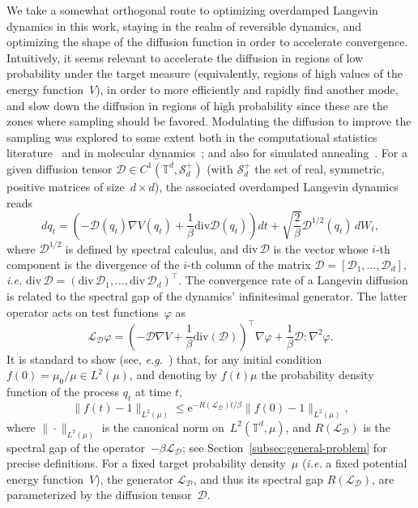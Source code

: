 \documentclass{article}
\newcommand{\cL}{\mathcal{L}}
\renewcommand{\leq}{\leqslant}
\def\T{\mathbb{T}}
\newcommand{\Diff}{\mathcal{D}}
\renewcommand{\dim}{d}
\newcommand{\cLD}{\cL_\Diff}
\begin{document}
We take a somewhat orthogonal route to optimizing overdamped Langevin dynamics in this work, staying in the realm of reversible dynamics, and optimizing the shape of the diffusion function in order to accelerate convergence. Intuitively, it seems relevant to accelerate the diffusion in regions of low probability under the target measure (equivalently, regions of high values of the energy function~$V$), in order to more efficiently and rapidly find another mode, and slow down the diffusion in regions of high probability since these are the zones where sampling should be favored. Modulating the diffusion to improve the sampling was explored to some extent both in the computational statistics literature~\cite{RobertsStramer} and in molecular dynamics~\cite{RBS16,ABDULLE2019349}; and also for simulated annealing~\cite{FQG97}. For a given diffusion tensor $\Diff \in C^1(\T^\dim,\mathcal{S}_\dim^{+})$ (with $\mathcal{S}_\dim^{+}$ the set of real, symmetric, positive matrices of size~$\dim \times \dim$), the associated overdamped Langevin dynamics reads
\begin{equation}
  \label{eq:dynamics_mult}
  dq_t = \left(- \Diff(q_t)\nabla V(q_t) + \frac1\beta \mathrm{div}\Diff(q_t) \right) dt + \sqrt{\frac2\beta} \Diff^{1/2}(q_t) \, dW_t,
\end{equation}
where $\Diff^{1/2}$ is defined by spectral calculus, and $\mathrm{div}\, \Diff$ is the vector whose $i$-th component is the divergence of the $i$-th column of the matrix $\Diff = [\Diff_1,\dots,\Diff_\dim]$, \emph{i.e.} $\mathrm{div}\, \Diff = \left(\mathrm{div}\, \Diff_1,\dots,\mathrm{div}\, \Diff_\dim\right)^{\top}$. The convergence rate of a Langevin diffusion is related to the spectral gap of the dynamics' infinitesimal generator. The latter operator acts on test functions~$\varphi$ as
\begin{equation}
  \label{eq:generator_cLD}
  \cLD \varphi = \left(- \Diff \nabla V + \frac1\beta \mathrm{div}(\Diff)\right)^{\top} \nabla \varphi + \frac1\beta \Diff : \nabla^2 \varphi.
\end{equation}
It is standard to show (see, \emph{e.g.}~\cite{LelievreNierPavliotis2013,bakry,lelievre_stoltz_2016}) that, for any initial condition $f(0) = \mu_0/\mu\in L^2(\mu)$, and denoting by $f(t)\mu$ the probability density function of the process $q_t$ at time $t$,
\begin{equation}
\label{eq:cvg}
\|f(t) - 1\|_{L^2(\mu)} \leq \mathrm{e}^{-R(\cLD)t/\beta}\|f(0) - 1\|_{L^2(\mu)},
\end{equation}
where $\|\cdot\|_{L^2(\mu)}$ is the canonical norm on~$L^2(\T^\dim, \mu)$, and $R(\cLD)$ is the spectral gap of the operator~$-\beta \cLD$; see Section~\ref{subsec:general-problem} for precise definitions. For a fixed target probability density~$\mu$ (\emph{i.e.} a fixed potential energy function~$V$), the generator $\cLD$, and thus its spectral gap $R(\cLD)$, are parameterized by the diffusion tensor~$\Diff$.
\end{document}
